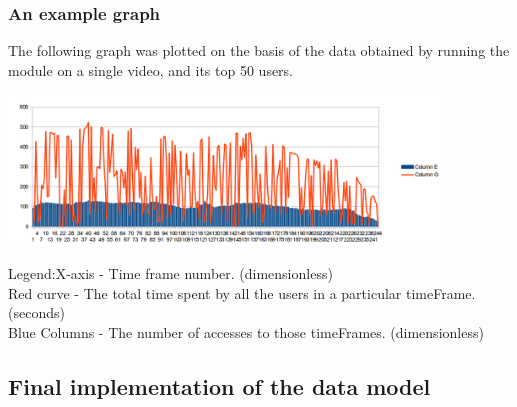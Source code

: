 \documentclass[12pt,xcolor=dvipsnames]{beamer}
\begin{document}
\begin{frame}[t]
\frametitle{An example graph}

The following graph was plotted on the basis of the data obtained by running the module on a single video, and its top 50 users.

\begin{center}
\includegraphics[height=4cm]{Diag2.png}\\ %
\end{center}



\begin{tiny}

Legend:X-axis - Time frame number. (dimensionless)
\\Red curve - The total time spent by all the users in a particular timeFrame. (seconds)
\\Blue Columns - The number of accesses to those timeFrames. (dimensionless)\\
\end{tiny}

\end{frame}

\subsection{Final implementation of the data model}
\end{document}
